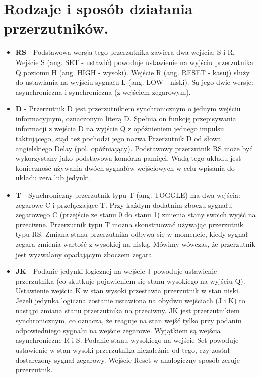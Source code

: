 \documentclass[12pt,a4paper]{article}
\begin{document}
	\section{Rodzaje i sposób działania przerzutników.}
	\begin{itemize}
		\item  \textbf{RS} - Podstawowa wersja tego przerzutnika zawiera dwa wejścia: S i R. Wejście S (ang. SET - ustawić) powoduje ustawienie na wyjściu przerzutnika Q poziomu H (ang. HIGH - wysoki). Wejście R (ang. RESET - kasuj) służy do ustawiania na wyjściu sygnału L (ang. LOW - niski).  Są jego dwie wersje: asynchroniczna i synchroniczna (z wejściem zegarowym).
		
		\item  \textbf{D} - Przerzutnik D jest przerzutnikiem synchronicznym o jednym wejściu informacyjnym, oznaczonym literą D. Spełnia on funkcję przepisywania informacji z wejścia D na wyjście Q z opóźnieniem jednego impulsu taktującego, stąd też pochodzi jego nazwa Przerzutnik D od słowa angielskiego Delay (pol. opóźniający). Podstawowy przerzutnik RS może być wykorzystany jako podstawowa komórka pamięci. Wadą tego układu jest konieczność używania dwóch sygnałów wejściowych w celu wpisania do układu zera lub jedynki. 
		
		\item \textbf{T} - Synchroniczny przerzutnik typu T (ang. TOGGLE) ma dwa wejścia: zegarowe C i przełączające T. Przy każdym dodatnim zboczu sygnału zegarowego C (przejście ze stanu 0 do stanu 1) zmienia stany swoich wyjść na przeciwne. Przerzutnik typu T można skonstruować używając przerzutnik typu RS. Zmiana stanu przerzutnika odbywa się w momencie, kiedy sygnał zegara zmienia wartość z wysokiej na niską. Mówimy wówczas, że przerzutnik jest wyzwalany opadającym zboczem zegara.
		
		\item  \textbf{JK} - Podanie jedynki logicznej na wejście J powoduje ustawienie przerzutnika (co skutkuje pojawieniem się stanu wysokiego na wyjściu Q). Ustawienie wejścia K w stan wysoki przestawia przerzutnik w stan niski. Jeżeli jedynka logiczna zostanie ustawiona na obydwu wejściach (J i K) to nastąpi zmiana stanu przerzutnika na przeciwny.
		JK jest przerzutnikiem synchronicznym, co oznacza, że reaguje na stan wejść tylko przy podaniu odpowiedniego sygnału na wejście zegarowe. Wyjątkiem są wejścia asynchroniczne R i S. Podanie stanu wysokiego na wejście Set powoduje ustawienie w stan wysoki przerzutnika niezależnie od tego, czy został dostarczony sygnał zegarowy. Wejście Reset w analogiczny sposób zeruje przerzutnik.
	\end{itemize}
\end{document}
